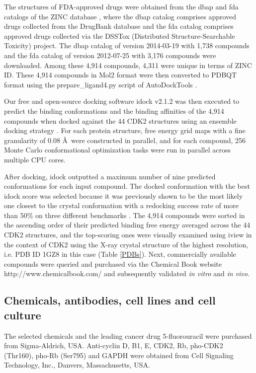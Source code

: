 \documentclass[10pt,letterpaper]{article}
\begin{document}
The structures of FDA-approved drugs were obtained from the dbap and fda catalogs of the ZINC database \cite{532,1178}, where the dbap catalog comprises approved drugs collected from the DrugBank database \cite{1594} and the fda catalog comprises approved drugs collected via the DSSTox (Distributed Structure-Searchable Toxicity) project. The dbap catalog of version 2014-03-19 with 1,738 compounds and the fda catalog of version 2012-07-25 with 3,176 compounds were downloaded. Among these 4,914 compounds, 4,311 were unique in terms of ZINC ID. These 4,914 compounds in Mol2 format were then converted to PDBQT format using the prepare\_ligand4.py script of AutoDockTools \cite{596}.

Our free and open-source docking software idock v2.1.2 \cite{1362} was then executed to predict the binding conformations and the binding affinities of the 4,914 compounds when docked against the 44 CDK2 structures using an ensemble docking strategy \cite{966,547,1128}. For each protein structure, free energy grid maps with a fine granularity of 0.08 \AA\ were constructed in parallel, and for each compound, 256 Monte Carlo conformational optimization tasks were run in parallel across multiple CPU cores.

After docking, idock outputted a maximum number of nine predicted conformations for each input compound. The docked conformation with the best idock score was selected because it was previously shown to be the most likely one closest to the crystal conformation with a redocking success rate of more than 50\% on three different benchmarks \cite{1362}. The 4,914 compounds were sorted in the ascending order of their predicted binding free energy averaged across the 44 CDK2 structures, and the top-scoring ones were visually examined using iview \cite{1366} in the context of CDK2 using the X-ray crystal structure of the highest resolution, i.e. PDB ID 1GZ8 in this case (Table \ref{PDBs}). Next, commercially available compounds were queried and purchased via the Chemical Book website http://www.chemicalbook.com/ and subsequently validated \textit{in vitro} and \textit{in vivo}.

\subsection*{Chemicals, antibodies, cell lines and cell culture}

The selected chemicals and the leading cancer drug 5-fluorouracil were purchased from Sigma-Aldrich, USA. Anti-cyclin D, B1, E, CDK2, Rb, pho-CDK2 (Thr160), pho-Rb (Ser795) and GAPDH were obtained from Cell Signaling Technology, Inc., Danvers, Massachusetts, USA.
\end{document}
